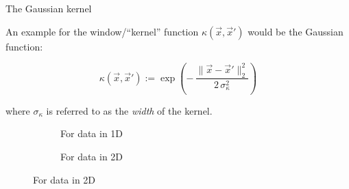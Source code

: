 \begin{frame}{The Gaussian kernel}

An example for the window/``kernel'' function $\kappa(\vec x, \vec x')$ would be the Gaussian function:

\begin{equation}
\kappa(\vec x, \vec x') := \exp\left( -\,\frac{\lVert \vec x - \vec x'\rVert^2_2}{2\,\sigma_{\kappa}^2} \right)
\label{eq:gauss_kernel}
\end{equation}

where $\sigma_{\kappa}$ is referred to as the \emph{width} of the kernel.

\begin{figure}[ht]
     \centering
     \begin{subfigure}[t]{0.45\textwidth}
         \centering
         \usebox{\imagebox}%
         \caption{For data in 1D}
         \label{fig:quadratic}
     \end{subfigure}
     \hspace{2mm}
     \begin{subfigure}[t]{0.45\textwidth}
         \centering
         \caption{For data in 2D}
         \label{fig:linear}
     \end{subfigure}
	 \label{fig:quadratic_density_gaussian}
\end{figure}

\end{frame}

